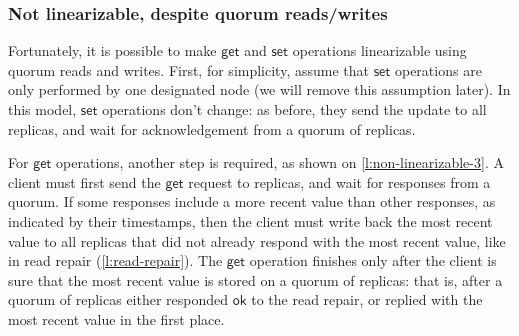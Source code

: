 \begin{frame}
    \label{s:non-linearizable-2}
    \frametitle{Not linearizable, despite quorum reads/writes}
\end{frame}
\label{l:non-linearizable-2}

Fortunately, it is possible to make $\mathsf{get}$ and $\mathsf{set}$ operations linearizable using quorum reads and writes.
First, for simplicity, assume that $\mathsf{set}$ operations are only performed by one designated node (we will remove this assumption later).
In this model, $\mathsf{set}$ operations don't change: as before, they send the update to all replicas, and wait for acknowledgement from a quorum of replicas.

For $\mathsf{get}$ operations, another step is required, as shown on \autoref{l:non-linearizable-3}.
A client must first send the $\mathsf{get}$ request to replicas, and wait for responses from a quorum.
If some responses include a more recent value than other responses, as indicated by their timestamps, then the client must write back the most recent value to all replicas that did not already respond with the most recent value, like in read repair (\autoref{l:read-repair}).
The $\mathsf{get}$ operation finishes only after the client is sure that the most recent value is stored on a quorum of replicas: that is, after a quorum of replicas either responded $\mathsf{ok}$ to the read repair, or replied with the most recent value in the first place.

